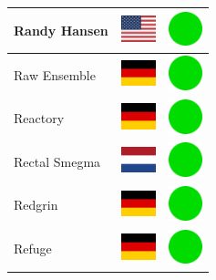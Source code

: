 \documentclass[12pt, a4paper, twoside]{report}
\begin{document}
\begin{center}
\begin{longtable}{|p{5cm}|p{2cm}|p{2cm}|}
Randy Hansen & \includegraphics[width=1cm]{4x3/us} & \includegraphics[width=1cm]{likes/y} \\ \hline
Raw Ensemble & \includegraphics[width=1cm]{4x3/de} & \includegraphics[width=1cm]{likes/y} \\ \hline
Reactory & \includegraphics[width=1cm]{4x3/de} & \includegraphics[width=1cm]{likes/y} \\ \hline
Rectal Smegma & \includegraphics[width=1cm]{4x3/nl} & \includegraphics[width=1cm]{likes/y} \\ \hline
Redgrin & \includegraphics[width=1cm]{4x3/de} & \includegraphics[width=1cm]{likes/y} \\ \hline
Refuge & \includegraphics[width=1cm]{4x3/de} & \includegraphics[width=1cm]{likes/y} \\ \hline

\end{longtable}
\end{center}
\end{document}

